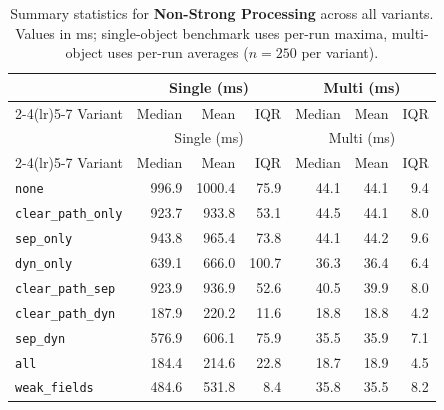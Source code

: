 \begin{longtable}{l rrr rrr}
\caption[Non-Strong Processing summary statistics]{Summary statistics for \textbf{Non-Strong Processing} across all variants. Values in ms; single-object benchmark uses per-run maxima, multi-object uses per-run averages ($n=250$ per variant).}\label{tab:stats-nonstrong} \\
\toprule
 & \multicolumn{3}{c}{Single (ms)} & \multicolumn{3}{c}{Multi (ms)} \\
\cmidrule(lr){2-4}\cmidrule(lr){5-7}
Variant & Median & Mean & IQR & Median & Mean & IQR \\
\midrule
\endfirsthead
\toprule
 & \multicolumn{3}{c}{Single (ms)} & \multicolumn{3}{c}{Multi (ms)} \\
\cmidrule(lr){2-4}\cmidrule(lr){5-7}
Variant & Median & Mean & IQR & Median & Mean & IQR \\
\midrule
\endhead
\bottomrule
\endfoot
\texttt{none} & 996.9 & 1000.4 & 75.9 & 44.1 & 44.1 & 9.4 \\
\texttt{clear\_path\_only} & 923.7 & 933.8 & 53.1 & 44.5 & 44.1 & 8.0 \\
\texttt{sep\_only} & 943.8 & 965.4 & 73.8 & 44.1 & 44.2 & 9.6 \\
\texttt{dyn\_only} & 639.1 & 666.0 & 100.7 & 36.3 & 36.4 & 6.4 \\
\texttt{clear\_path\_sep} & 923.9 & 936.9 & 52.6 & 40.5 & 39.9 & 8.0 \\
\texttt{clear\_path\_dyn} & 187.9 & 220.2 & 11.6 & 18.8 & 18.8 & 4.2 \\
\texttt{sep\_dyn} & 576.9 & 606.1 & 75.9 & 35.5 & 35.9 & 7.1 \\
\texttt{all} & 184.4 & 214.6 & 22.8 & 18.7 & 18.9 & 4.5 \\
\texttt{weak\_fields} & 484.6 & 531.8 & 8.4 & 35.8 & 35.5 & 8.2 \\
\end{longtable}
